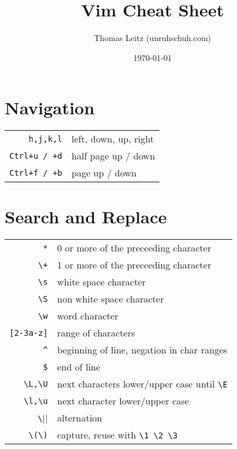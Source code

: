 \documentclass[10pt,a4paper,landscape,oneside]{scrartcl}
\title{Vim Cheat Sheet}
\author{Thomas Leitz (unruhschuh.com)}
\date{\today}
\begin{document}
\raggedcolumns

\begin{multicols*}{3}
  
\maketitle
\centering
\section*{Navigation}
\begin{tabular}{@{}rl@{}}
\verb|h,j,k,l|     & left, down, up, right \\
\verb|Ctrl+u / +d| & half page up / down \\
\verb|Ctrl+f / +b| & page up / down
\end{tabular}

\section*{Search and Replace}
\begin{tabular}{@{}rl@{}}
\verb|*|        & 0 or more of the preceeding character \\
\verb|\+|       & 1 or more of the preceeding character \\
\verb|\s|       & white space character \\
\verb|\S|       & non white space character \\
\verb|\w|       & word character \\
\verb|[2-3a-z]| & range of characters \\
\verb|^|        & beginning of line, negation in char ranges \\
\verb|$|        & end of line \\
\verb|\L,\U|    & next characters lower/upper case until \verb|\E| \\
\verb|\l,\u|    & next character lower/upper case \\
\verb|\||       & alternation \\
\verb|\(\)|     & capture, reuse with \verb|\1 \2 \3|
\end{tabular}

\end{multicols*}
\end{document}
